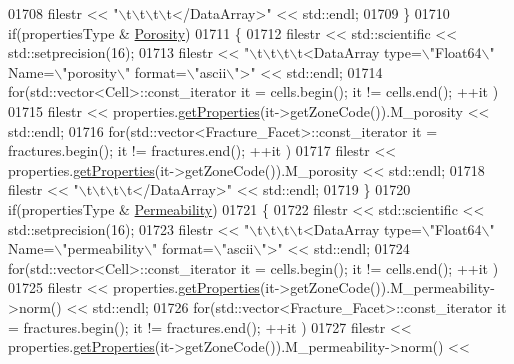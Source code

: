 \begin{DoxyCode}
01708         filestr << \textcolor{stringliteral}{"\(\backslash\)t\(\backslash\)t\(\backslash\)t\(\backslash\)t</DataArray>"} << std::endl;
01709     \}
01710     \textcolor{keywordflow}{if}(propertiesType & \hyperlink{namespaceFVCode3D_ab3abc77722284ce4344be90bb61c1a41a8bb92532e203b2a2b45c4b2ce0354a90}{Porosity})
01711     \{
01712         filestr << std::scientific << std::setprecision(16);
01713         filestr << \textcolor{stringliteral}{"\(\backslash\)t\(\backslash\)t\(\backslash\)t\(\backslash\)t<DataArray type=\(\backslash\)"Float64\(\backslash\)" Name=\(\backslash\)"porosity\(\backslash\)" format=\(\backslash\)"ascii\(\backslash\)">"} << std::endl;
01714         \textcolor{keywordflow}{for}(std::vector<Cell>::const\_iterator it = cells.begin(); it != cells.end(); ++it )
01715             filestr << properties.\hyperlink{classFVCode3D_1_1PropertiesMap_ace888d15c9a4ab13d5e217a3a565604c}{getProperties}(it->getZoneCode()).M\_porosity << std::endl;
01716         \textcolor{keywordflow}{for}(std::vector<Fracture\_Facet>::const\_iterator it = fractures.begin(); it != fractures.end(); ++it
       )
01717             filestr <<  properties.\hyperlink{classFVCode3D_1_1PropertiesMap_ace888d15c9a4ab13d5e217a3a565604c}{getProperties}(it->getZoneCode()).M\_porosity << std::endl;
01718         filestr << \textcolor{stringliteral}{"\(\backslash\)t\(\backslash\)t\(\backslash\)t\(\backslash\)t</DataArray>"} << std::endl;
01719     \}
01720     \textcolor{keywordflow}{if}(propertiesType & \hyperlink{namespaceFVCode3D_ab3abc77722284ce4344be90bb61c1a41a23fa3ea40f896b28978ffc259e5281cf}{Permeability})
01721     \{
01722         filestr << std::scientific << std::setprecision(16);
01723         filestr << \textcolor{stringliteral}{"\(\backslash\)t\(\backslash\)t\(\backslash\)t\(\backslash\)t<DataArray type=\(\backslash\)"Float64\(\backslash\)" Name=\(\backslash\)"permeability\(\backslash\)" format=\(\backslash\)"ascii\(\backslash\)">"} << 
      std::endl;
01724         \textcolor{keywordflow}{for}(std::vector<Cell>::const\_iterator it = cells.begin(); it != cells.end(); ++it )
01725             filestr << properties.\hyperlink{classFVCode3D_1_1PropertiesMap_ace888d15c9a4ab13d5e217a3a565604c}{getProperties}(it->getZoneCode()).M\_permeability->norm() << 
      std::endl;
01726         \textcolor{keywordflow}{for}(std::vector<Fracture\_Facet>::const\_iterator it = fractures.begin(); it != fractures.end(); ++it
       )
01727             filestr <<  properties.\hyperlink{classFVCode3D_1_1PropertiesMap_ace888d15c9a4ab13d5e217a3a565604c}{getProperties}(it->getZoneCode()).M\_permeability->norm() << 

\end{DoxyCode}
